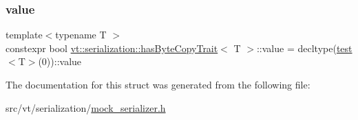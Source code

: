 \subsubsection{\texorpdfstring{value}{value}}
{\footnotesize\ttfamily template$<$typename T $>$ \\
constexpr bool \hyperlink{structvt_1_1serialization_1_1has_byte_copy_trait}{vt\+::serialization\+::has\+Byte\+Copy\+Trait}$<$ T $>$\+::value = decltype(\hyperlink{structvt_1_1serialization_1_1has_byte_copy_trait_aff4ab3bf26b647e42f63359adeab1355}{test}$<$T$>$(0))\+::value\hspace{0.3cm}{\ttfamily [static]}}



The documentation for this struct was generated from the following file\+:\begin{DoxyCompactItemize}
\item 
src/vt/serialization/\hyperlink{mock__serializer_8h}{mock\+\_\+serializer.\+h}\end{DoxyCompactItemize}

